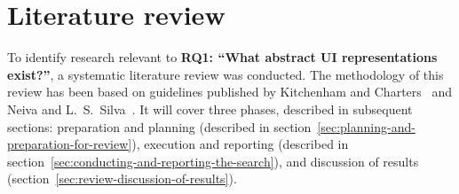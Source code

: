 \chapter{Literature review}\label{ch:literature-review}

To identify research relevant to \textbf{RQ1: \enquote{What abstract UI representations exist?}}, a systematic literature review was conducted.
The methodology of this review has been based on guidelines published by Kitchenham and Charters~\cite{kitchenham_guidelines_2007} and Neiva and L.~S.~Silva~\cite{neiva_systematic_2016}.
It will cover three phases, described in subsequent sections: preparation and planning (described in section~\ref{sec:planning-and-preparation-for-review}), execution and reporting (described in section~\ref{sec:conducting-and-reporting-the-search}), and discussion of results (section~\ref{sec:review-discussion-of-results}).






